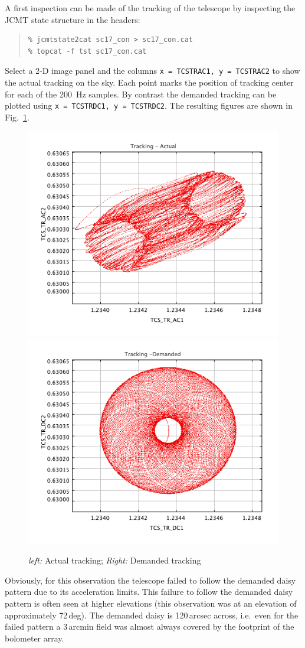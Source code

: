 \documentclass[twoside,11pt]{article}
\renewcommand{\_}{\texttt{\symbol{95}}}
\newenvironment{myquote}{\begin{quote}\begin{small}}{\end{small}\end{quote}}
\begin{document}
A first inspection can be made of the tracking of the telescope by
inspecting the JCMT state structure in the headers:

\begin{myquote}
\begin{verbatim}
% jcmtstate2cat sc17_con > sc17_con.cat
% topcat -f tst sc17_con.cat
\end{verbatim}
\end{myquote}

Select a 2-D image panel and the columns \texttt{x = TCS\_TR\_AC1, y =
TCS\_TR\_AC2} to show the actual tracking on the sky.  Each point
marks the position of tracking center for each of the 200~Hz samples.
By contrast the demanded tracking can be plotted using
\texttt{x~=~TCS\_TR\_DC1, y~=~TCS\_TR\_DC2}. The resulting figures are
shown in Fig.~\ref{fig:tracking}.

\begin{figure}[ht]
\begin{center}
\includegraphics[width=0.45\linewidth]{sc19_tracking_actual}
\hspace{0.03\linewidth}
\includegraphics[width=0.45\linewidth]{sc19_tracking_demand}
\caption{\textsl{left:} Actual tracking; \textsl{Right:} Demanded tracking }
\label{fig:tracking}
\end{center}
\end{figure}

Obviously, for this observation the telescope failed to follow the
demanded daisy pattern due to its acceleration limits. This failure to
follow the demanded daisy pattern is often seen at higher elevations
(this observation was at an elevation of approximately 72\,deg). The
demanded daisy is 120\,arcsec across, i.e.\ even for the failed
pattern a 3\,arcmin field was almost always covered by the footprint
of the bolometer array.
\end{document}
